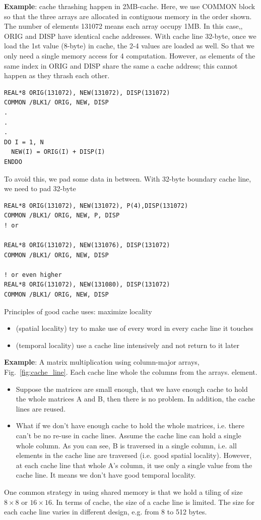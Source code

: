 {\bf Example}: cache thrashing happen in 2MB-cache. Here, we use
COMMON block so that the three arrays are allocated in contiguous
memory in the order shown. The number of elements 131072 means each
array occupy 1MB. In this case,, ORIG and DISP have identical cache
addresses. With cache line 32-byte, once we load the 1st value
(8-byte) in cache, the 2-4 values are loaded as well. So that we only
need a single memory access for 4 computation.  However, as elements
of the same index in ORIG and DISP share the same a cache address;
this cannot happen as they thrash each other. 
\begin{lstlisting}
REAL*8 ORIG(131072), NEW(131072), DISP(131072)
COMMON /BLK1/ ORIG, NEW, DISP
.
.
.
DO I = 1, N
  NEW(I) = ORIG(I) + DISP(I)
ENDDO
\end{lstlisting}
To avoid this, we pad some data in between. With 32-byte boundary
cache line, we need to pad 32-byte
\begin{lstlisting}
REAL*8 ORIG(131072), NEW(131072), P(4),DISP(131072)
COMMON /BLK1/ ORIG, NEW, P, DISP
! or

REAL*8 ORIG(131072), NEW(131076), DISP(131072)
COMMON /BLK1/ ORIG, NEW, DISP

! or even higher 
REAL*8 ORIG(131072), NEW(131080), DISP(131072)
COMMON /BLK1/ ORIG, NEW, DISP
\end{lstlisting}


Principles of good cache uses: maximize locality
\begin{itemize}
\item (spatial locality) try to make use of every word in every cache
  line it touches
\item (temporal locality) use a cache line intensively and not return
  to it later
\end{itemize}

{\bf Example}: A matrix multiplication using column-major arrays,
Fig.~\ref{fig:cache_line}. Each cache line whole the columns from the
arrays. 
element. 
\begin{itemize}
\item Suppose the matrices are small enough, that we have enough
  cache to hold the whole matrices A and B, then there is no problem. 
  In addition, the cache lines are reused. 

\item What if we don't have enough cache to hold the whole matrices,
  i.e. there can't be no re-use in cache lines. Assume the cache line
  can hold a single whole column. As you can see, B is traversed in a
  single column, i.e. all elements in the cache line are traversed
  (i.e. good spatial locality). However, at each cache line that whole
  A's column, it use only a single value from the cache line. It means
  we don't have good temporal locality. 
\end{itemize}
One common strategy in using shared memory is that we hold a tiling of
size $8\times 8$ or $16\times 16$. In terms of cache, the size of a
cache line is limited.  The size for each cache line varies in
different design, e.g. from 8 to 512 bytes.


